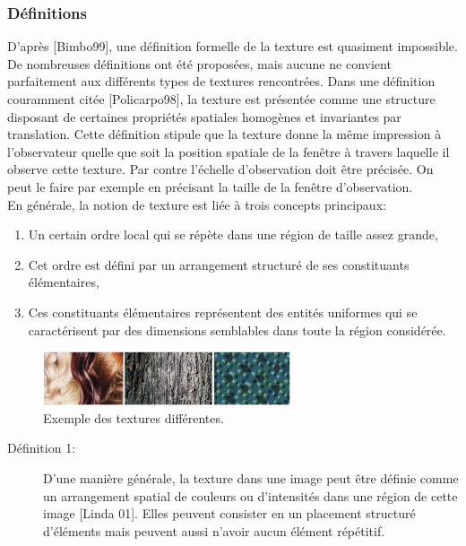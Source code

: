 \subsubsection{Définitions}

D'après [Bimbo99], une définition formelle de la texture est quasiment impossible. De nombreuses définitions ont été proposées, mais aucune ne convient parfaitement aux différents types de textures rencontrées. Dans une définition couramment citée [Policarpo98], la texture est présentée comme une structure disposant de certaines propriétés spatiales homogènes et invariantes par translation. Cette définition stipule que la texture donne la même impression à l'observateur quelle que soit la position spatiale de la fenêtre à travers laquelle il observe cette texture. Par contre l'échelle d’observation doit être précisée. On peut le faire par exemple en précisant la taille de la fenêtre d’observation.\\

En générale, la notion de texture est liée à trois concepts principaux:
\begin{enumerate}
	\item Un certain ordre local qui se répète dans une région de taille assez grande,
	
	\item Cet ordre est défini par un arrangement structuré de ses constituants élémentaires,
	
	\item Ces constituants élémentaires représentent des entités uniformes qui se caractérisent par des dimensions semblables dans toute la région considérée.\\ 
	
\end{enumerate}

\begin{figure}[H]
	\label{fig:textures}
	\centering
	\includegraphics[width=0.65\textwidth]{Figures/textures} %
	\caption{Exemple des textures différentes.}
\end{figure}

\begin{description}
	\item[Définition 1:] 	
	D'une manière générale, la texture dans une image peut être définie comme un arrangement spatial de couleurs ou d'intensités dans une région de cette image [Linda 01]. Elles peuvent consister en un placement structuré d’éléments mais peuvent aussi n’avoir aucun élément répétitif.
\end{description}

